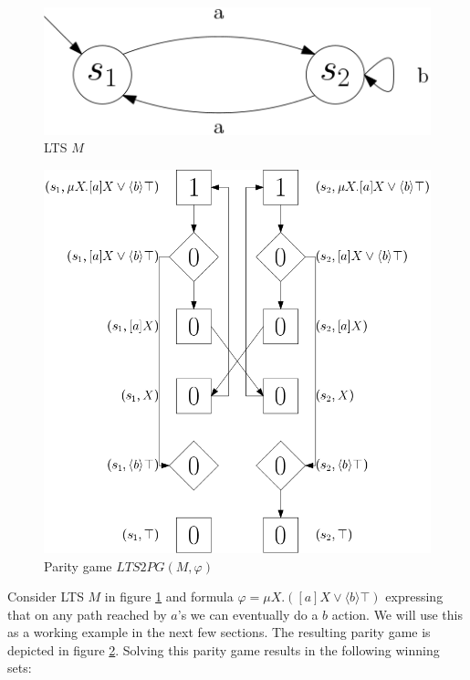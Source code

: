 \begin{figure}[h]
	\centering
	\includegraphics[scale=0.3]{Examples/ExamleVerification/LTSprojempty}
	\caption[LTS $M$]{LTS $M$}
	\label{fig:exverltsprojempty}
\end{figure}\begin{figure}[h]
\centering
\includegraphics[scale=0.3]{Examples/ExamleVerification/PG}
\caption[Parity game $LTS2PG(M, \varphi)$]{Parity game $LTS2PG(M, \varphi)$}
\label{fig:exverpg}
\end{figure}
Consider LTS $M$ in figure \ref{fig:exverltsprojempty} and formula $\varphi = \mu X.([a]X \vee \langle b \rangle \top)$ expressing that on any path reached by $a$'s we can eventually do a $b$ action. We will use this as a working example in the next few sections. The resulting parity game is depicted in figure \ref{fig:exverpg}. Solving this parity game results in the following winning sets:
